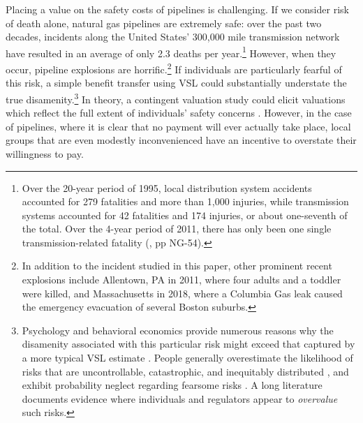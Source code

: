 \documentclass[12pt]{article}
\begin{document}
Placing a value on the safety costs of pipelines is challenging. If we consider risk of death alone, natural gas pipelines are extremely safe: over the past two decades, incidents along the United States' 300,000 mile transmission network have resulted in an average of only 2.3 deaths per year.\footnote{Over the 20-year period of 1995, local distribution system accidents accounted for 279 fatalities and more than 1,000 injuries, while transmission systems accounted for 42 fatalities and 174 injuries, or about one-seventh of the total. Over the 4-year period of 2011, there has only been one single transmission-related fatality  (\citealp{united_states_department_of_energy_quadrennial_2015}, pp NG-54).} However, when they occur, pipeline explosions are horrific.\footnote{In addition to the incident studied in this paper, other prominent recent explosions include Allentown, PA in 2011, where four adults and a toddler were killed, and Massachusetts in 2018, where a Columbia Gas leak caused the emergency evacuation of several Boston suburbs.} If individuals are particularly fearful of this risk, a simple benefit transfer using VSL could substantially understate the true disamenity.\footnote{Psychology and behavioral economics provide numerous reasons why the disamenity associated with this particular risk might exceed that captured by a more typical VSL estimate \citep{kahneman_judgment_1982}. People generally overestimate the likelihood of risks that are uncontrollable, catastrophic, and inequitably distributed \citep{slovic_perception_1987}, and exhibit probability neglect regarding fearsome risks \citep{sunstein_overreaction_2011}. A long literature documents evidence where individuals \citep{gayer2000private} and regulators \citep{viscusi1999risk} appear to \textit{overvalue} such risks.} In theory, a contingent valuation study could elicit valuations which reflect the full extent of individuals' safety concerns \citep{carson_contingent_2012}. However, in the case of pipelines, where it is clear that no payment will ever actually take place, local groups that are even modestly inconvenienced have an incentive to overstate their willingness to pay. 
\end{document}
